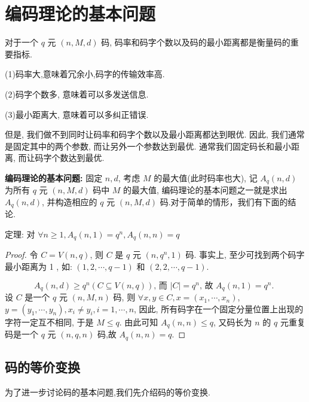 \section{ 编码理论的基本问题}

对于一个 $ q $ 元 $ (n, M , d) $ 码, 码率和码字个数以及码的最小距离都是衡量码的重要指标.

(1)码率大,意味着冗余小,码字的传输效率高.

(2)码字个数多, 意味着可以多发送信息.

(3)最小距离大, 意味着可以多纠正错误.

但是, 我们做不到同时让码率和码字个数以及最小距离都达到眼优. 因此, 我们通常是固定其中的两个参数, 而让另外一个参数达到最优. 通常我们固定码长和最小距离, 而让码字个数达到最优.


\textbf{编码理论的基本问题:} 固定 $ n, d $, 考虑 $ M $ 的最大值(此时码率也大), 记 $ A_{q}(n, d) $ 为所有 $ q $ 元 $ (n, M, d) $ 码中 $ M $ 的最大值, 编码理论的基本问题之一就是求出 $ A_{q}(n, d) $, 并构造相应的 $ q $ 元 $ (n, M, d) $ 码.对于简单的情形，我们有下面的结论.

\begin{theorem}
    定理: 对 $ \forall n \geq 1, A_{q}(n, 1)=q^{n}, A_{q}(n, n)=q $
\end{theorem}
\begin{proof}
    令 $ C=V(n, q) $, 则 $ C $ 是 $ q $ 元 $ \left(n, q^{n}, 1\right) $ 码. 事实上, 至少可找到两个码字最小距离为 1 ,
如: $ (1,2, \cdots, q-1) $ 和 $ (2,2, \cdots, q-1) $.

$$
A_{q}(n, d) \geq q^{n}(C \subseteq V(n, q)) \text {, 而 }|C|=q^{n} \text {, 故 } A_{q}(n, 1)=q^{n} \text {. }
$$
设 $ C $ 是一个 $ q $ 元 $ (n, M, n) $ 码, 则 $ \forall x, y \in C, x=\left(x_{1}, \cdots, x_{n}\right) $, $ y=\left(y_{1}, \cdots, y_{n}\right), x_{i} \neq y_{i}, i=1, \cdots, n $, 因此, 所有码字在一个固定分量位置上出现的字符一定互不相同, 于是 $ M \leq q $. 由此可知 $ A_{q}(n, n) \leq q $, 又码长为 $ n $ 的 $ q $ 元重复码是一个 $ q $ 元 $ (n, q, n) $ 码,故 $ A_{q}(n, n)=q $.
\end{proof}

\subsection{码的等价变换}
为了进一步讨论码的基本问题,我们先介绍码的等价变换.

